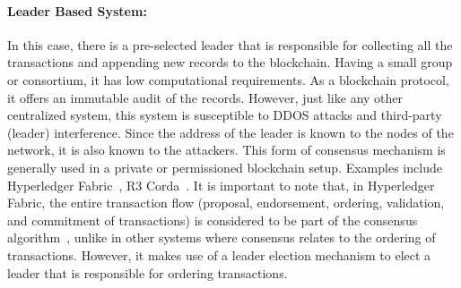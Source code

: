 \paragraph{Leader Based System:}In this case, there is a pre-selected leader
that is responsible for collecting all the transactions and appending new
records to the blockchain. Having a small group or consortium, it has low
computational requirements. As a blockchain protocol, it offers an immutable
audit of the records. However, just like any other centralized system, this
system is susceptible to DDOS attacks and third-party (leader) interference.
Since the address of the leader is known to the nodes of the network, it is
also known to the attackers. This form of consensus mechanism is generally used
in a private or permissioned blockchain setup. Examples include Hyperledger
Fabric~\cite{androulaki2018hyperledger}, R3 Corda~\cite{brown2016corda}. It is
important to note that, in Hyperledger Fabric, the entire transaction flow
(proposal, endorsement, ordering, validation, and commitment of transactions)
is considered to be part of the consensus
algorithm~\cite{hyperledgerfabric,hyperledgerfabric2}, unlike in other systems
where consensus relates to the ordering of transactions. However, it makes use
of a leader election mechanism to elect a leader that is responsible for
ordering transactions.

